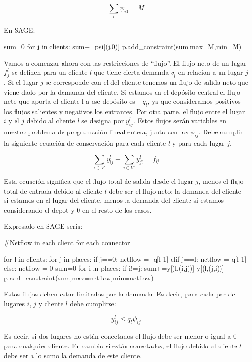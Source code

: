 \documentclass{article}
\begin{document}
$$\sum_i \psi_{i0}=M$$

En SAGE:

\begin{sageblock}
sum=0
for j in clients:
    sum+=psi[(j,0)]
p.add_constraint(sum,max=M,min=M)
\end{sageblock}


Vamos a comenzar ahora con las restricciones de ``flujo''. El flujo neto de un lugar $f^l_{j}$ se definen para un cliente $l$ que tiene cierta demanda $q_l$ en relación a un lugar $j$. Si el lugar $j$ se corresponde con el del cliente tenemos un flujo de salida neto que viene dado por la demanda del cliente. Si estamos en el depósito central el flujo neto que aporta el cliente l a ese depósito es $-q_l$, ya que consideramos positivos los flujos salientes y negativos los entrantes. Por otra parte, el flujo entre el lugar $i$ y el $j$ debido al cliente $l$ se designa por $y^l_{ij}$. Estos flujos serán variables en nuestro problema de programación lineal entera, junto con los $\psi_{ij}$. Debe cumplir la siguiente ecuación de conservación para cada cliente $l$ y para cada lugar $j$.


$$\sum_{i \in V'} y^l_{ij}-\sum_{i \in V'} y^l_{ji} = f_{lj}$$

Esta ecuación significa que el flujo total de salida desde el lugar $j$, menos el flujo total de entrada debido al cliente $l$ debe ser el flujo neto: la demanda del cliente si estamos en el lugar del cliente, menos la demanda del cliente si estamos considerando el depot y $0$ en el resto de los casos.

Expresado en SAGE sería:

\begin{sageblock}

#Netflow in each client for each connector

for l in clients:
    for j in places:
        if j==0:
            netflow = -q[l-1]
        elif j==l:
            netflow = q[l-1]
        else:
            netflow = 0
        sum=0
        for i in places:
           if i!=j:
            sum+=y[(l,(i,j))]-y[(l,(j,i))]
        p.add_constraint(sum,max=netflow,min=netflow)

\end{sageblock}

Estos flujos deben estar limitados por la demanda. Es decir, para cada par de lugares $i$, $j$ y cliente $l$ debe cumplirse:

$$y^l_{ij} \leq q_l \psi_{ij}$$

Es decir, si dos lugares no están conectados el flujo debe ser menor o igual a 0 para cualquier cliente. En cambio si están conectados, el flujo debido al cliente $l$ debe ser a lo sumo la demanda de este cliente. 
\end{document}

